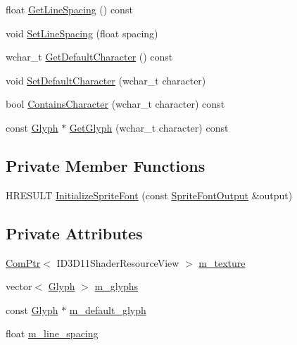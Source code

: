 \begin{DoxyCompactItemize}
\item 
float \hyperlink{classmage_1_1_sprite_font_ae90ee76625716c6cbce851b6fd14524b}{Get\+Line\+Spacing} () const
\item 
void \hyperlink{classmage_1_1_sprite_font_adc013412c3b59e40c326552b77d9c457}{Set\+Line\+Spacing} (float spacing)
\item 
wchar\+\_\+t \hyperlink{classmage_1_1_sprite_font_a06c0cfea70ad01946447e7eed901dc57}{Get\+Default\+Character} () const
\item 
void \hyperlink{classmage_1_1_sprite_font_a0b0feb25673d6f9d9e3215167800d817}{Set\+Default\+Character} (wchar\+\_\+t character)
\item 
bool \hyperlink{classmage_1_1_sprite_font_a01836c4197661dbdd66c624d8dc6a7c3}{Contains\+Character} (wchar\+\_\+t character) const
\item 
const \hyperlink{structmage_1_1_glyph}{Glyph} $\ast$ \hyperlink{classmage_1_1_sprite_font_aa13424a1e0153ffb9433bb2cb416360b}{Get\+Glyph} (wchar\+\_\+t character) const
\end{DoxyCompactItemize}
\subsection*{Private Member Functions}
\begin{DoxyCompactItemize}
\item 
H\+R\+E\+S\+U\+LT \hyperlink{classmage_1_1_sprite_font_a5182bb818863ba2433a40074cb1bf8a0}{Initialize\+Sprite\+Font} (const \hyperlink{structmage_1_1_sprite_font_output}{Sprite\+Font\+Output} \&output)
\end{DoxyCompactItemize}
\subsection*{Private Attributes}
\begin{DoxyCompactItemize}
\item 
\hyperlink{namespacemage_ae74f374780900893caa5555d1031fd79}{Com\+Ptr}$<$ I\+D3\+D11\+Shader\+Resource\+View $>$ \hyperlink{classmage_1_1_sprite_font_ad3740a71e8dfeb70e167c33fec855720}{m\+\_\+texture}
\item 
vector$<$ \hyperlink{structmage_1_1_glyph}{Glyph} $>$ \hyperlink{classmage_1_1_sprite_font_acf4efc927a2ca3fc0eb297ed080ddfbb}{m\+\_\+glyphs}
\item 
const \hyperlink{structmage_1_1_glyph}{Glyph} $\ast$ \hyperlink{classmage_1_1_sprite_font_ad25667d3bfb539b71b39124fdc8ed6d6}{m\+\_\+default\+\_\+glyph}
\item 
float \hyperlink{classmage_1_1_sprite_font_a2b6de0c210a7cf5c72dd1bb69bff7a3b}{m\+\_\+line\+\_\+spacing}
\end{DoxyCompactItemize}


